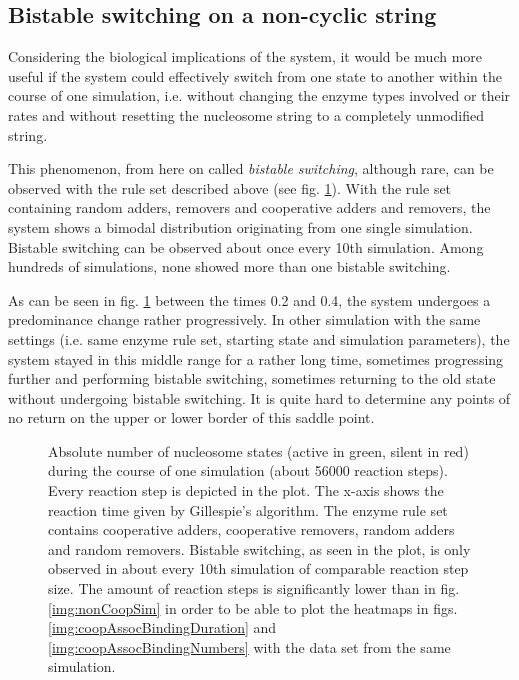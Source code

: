         \subsection{Bistable switching on a non-cyclic string}
            Considering the biological implications of the system, it would be much more useful if the system could effectively switch from one state to another within the course of one simulation, i.e. without changing the enzyme types involved or their rates and without resetting the nucleosome string to a completely unmodified string.

            This phenomenon, from here on called \textit{bistable switching}, although rare, can be observed with the rule set described above (see fig. \ref{img:nonCyclBistability_runPlot2}). With the rule set containing random adders, removers and cooperative adders and removers, the system shows a bimodal distribution originating from one single simulation. Bistable switching can be observed about once every 10th simulation. Among hundreds of simulations, none showed more than one bistable switching.

            As can be seen in fig. \ref{img:nonCyclBistability_runPlot2} between the times 0.2 and 0.4, the system undergoes a predominance change rather progressively. In other simulation with the same settings (i.e. same enzyme rule set, starting state and simulation parameters), the system stayed in this middle range for a rather long time, sometimes progressing further and performing bistable switching, sometimes returning to the old state without undergoing bistable switching. It is quite hard to determine any points of no return on the upper or lower border of this saddle point.

            \begin{figure}[htpb!]
                \centering
                \caption{Absolute number of nucleosome states (active in green, silent in red) during the course of one simulation (about 56000 reaction steps). Every reaction step is depicted in the plot. The x-axis shows the reaction time given by Gillespie's algorithm. The enzyme rule set contains cooperative adders, cooperative removers, random adders and random removers. Bistable switching, as seen in the plot, is only observed in about every 10th simulation of comparable reaction step size. The amount of reaction steps is significantly lower than in fig. \ref{img:nonCoopSim} in order to be able to plot the heatmaps in figs. \ref{img:coopAssocBindingDuration} and \ref{img:coopAssocBindingNumbers} with the data set from the same simulation.}
                \label{img:nonCyclBistability_runPlot2}
            \end{figure}

